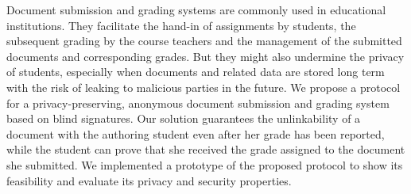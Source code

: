 


Document submission and grading systems are commonly used in educational institutions.
They facilitate the hand-in of assignments
by students, the subsequent grading by the course teachers and the 
management of the submitted documents and corresponding grades.
But they might also undermine the privacy of students, especially
when documents and related data are stored long term with the risk of
leaking to malicious parties in the future. 
%
%
We propose a protocol for a privacy-preserving, anonymous document
submission and grading system based on blind signatures.
Our solution guarantees the unlinkability of
a document with the authoring student even after her grade has been
reported, while the student can prove that she received the grade
assigned to the document she submitted. 
%
We implemented a prototype of the proposed protocol to show its
feasibility and evaluate its privacy and security properties.
